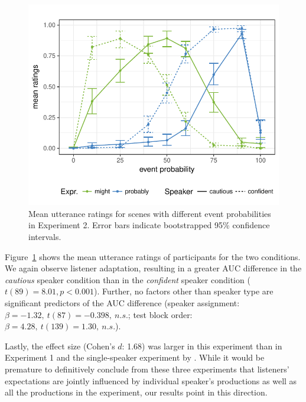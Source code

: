 \begin{figure}
\includegraphics[width=\columnwidth]{plots/exp2-results.pdf}
\caption{Mean utterance ratings for scenes with different event probabilities in Experiment 2. Error bars indicate bootstrapped 95\% confidence intervals. \label{fig:exp2-results}}
\end{figure}

Figure~\ref{fig:exp2-results} shows the mean utterance ratings of participants for the two conditions. We again observe listener adaptation, resulting in a greater AUC difference in the \emph{cautious} speaker 
condition than in the \emph{confident} speaker condition ($t(89)=8.01, p < 0.001$). Further, no factors
other than speaker type are significant predictors of the AUC difference 
(speaker assignment: $\beta=-1.32, \ t(87)=-0.398, \ n.s.$; test block order:  $\beta=4.28, \ t(139)=1.30, \ n.s.$).

Lastly, the effect size (Cohen's $d$: 1.68) was larger in this experiment than in Experiment 1 and the single-speaker 
experiment by \cite{Schuster2018}. While it would be premature to definitively conclude from these three experiments that listeners' expectations are jointly influenced
by individual speaker's productions as well as all the productions in the experiment, our results point in this direction. 

